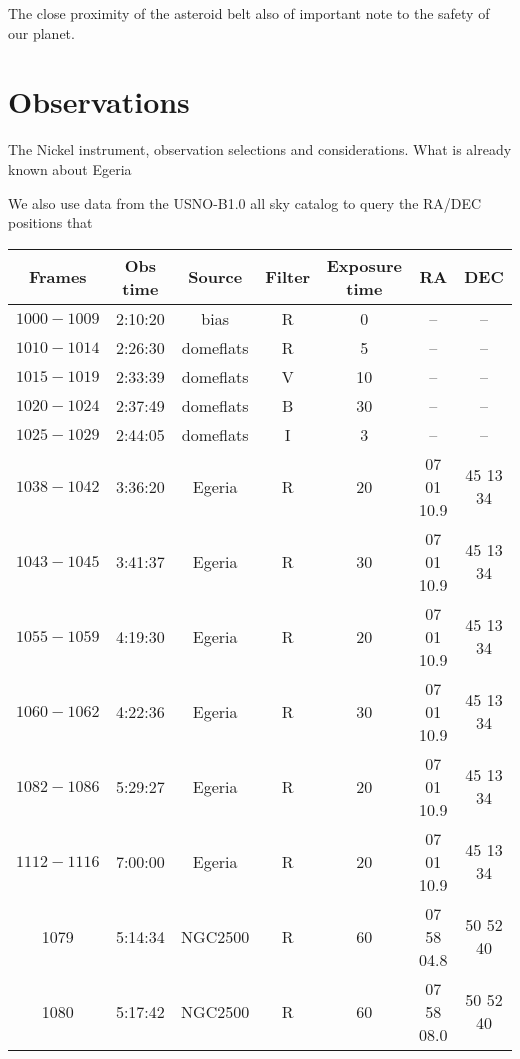 \documentclass[preprint]{aastex62}
\begin{document}
The close proximity of the asteroid belt also of important note to the safety of our planet.


\section{Observations} \label{sec:observations}
The Nickel instrument, observation selections and considerations. What is already known about Egeria

We also use data from the USNO-B1.0 all sky catalog to query the RA/DEC positions that 

\begin{table}[]
\begin{center}
\begin{tabular}{|c|c|c|c|c|c|c|}
\hline
    Frames    & Obs time & Source  & Filter & Exposure time & RA         & DEC        \\
\hline\hline
$1000-1009$ & 2:10:20  & bias      & R      & 0             & --         & --         \\
$1010-1014$ & 2:26:30  & domeflats & R      & 5             & --         & --         \\
$1015-1019$ & 2:33:39  & domeflats & V      & 10            & --         & --         \\
$1020-1024$ & 2:37:49  & domeflats & B      & 30            & --         & --         \\
$1025-1029$ & 2:44:05  & domeflats & I      & 3             & --         & --         \\
$1038-1042$ & 3:36:20  & Egeria    & R      & 20            & 07 01 10.9 & 45 13 34   \\
$1043-1045$ & 3:41:37  & Egeria    & R      & 30            & 07 01 10.9 & 45 13 34   \\
$1055-1059$ & 4:19:30  & Egeria    & R      & 20            & 07 01 10.9 & 45 13 34   \\
$1060-1062$ & 4:22:36  & Egeria    & R      & 30            & 07 01 10.9 & 45 13 34   \\
$1082-1086$ & 5:29:27  & Egeria    & R      & 20            & 07 01 10.9 & 45 13 34   \\
$1112-1116$ & 7:00:00  & Egeria    & R      & 20            & 07 01 10.9 & 45 13 34   \\
1079      & 5:14:34  & NGC2500   & R      & 60            & 07 58 04.8 & 50 52 40   \\
1080      & 5:17:42  & NGC2500   & R      & 60            & 07 58 08.0 & 50 52 40   \\

\end{tabular}
\end{center}
\end{table}
\end{document}
